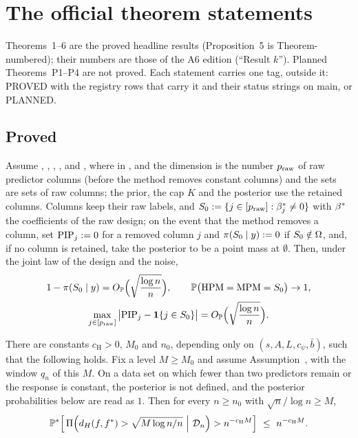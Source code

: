 \section{The official theorem statements}\label{sec:theorems}

Theorems~1--6 are the proved headline results (Proposition~5 is Theorem-numbered); their numbers are those of the A6
edition (``Result $k$''). Planned Theorems~P1--P4 are not proved. Each statement carries one tag, outside it: PROVED with
the registry rows that carry it and their status strings on main, or PLANNED.

\subsection{Proved}\label{sec:proved}

\begin{mainthm}\label{thm:post-random}
Assume , , , ,  and , where in ,  and  the
dimension is the number $p_{\mathrm{raw}}$ of raw predictor columns (before the method removes constant columns) and the sets are
sets of raw columns; the prior, the cap $K$ and the posterior use the retained columns. Columns keep their raw labels, and $S_0:=\{j\in[p_{\mathrm{raw}}]:\beta^*_j\neq0\}$ with $\beta^*$ the coefficients of
the raw design; on the event that the method removes a column, set $\mathrm{PIP}_j:=0$ for a removed column $j$ and
$\pi(S_0\mid y):=0$ if $S_0\notin\Omega$, and, if no column is retained, take the posterior to be a point mass at $\emptyset$.
Then, under the joint law of the design and the noise,
\begin{gather}
  1-\pi(S_0\mid y)=O_{\mathbb{P}}\Big(\sqrt{\frac{\log n}{n}}\Big),\qquad \mathbb{P}\big(\mathrm{HPM}=\mathrm{MPM}=S_0\big)\to1,\label{eq:post-random}\\
  \max_{j\in[p_{\mathrm{raw}}]}\big|\mathrm{PIP}_j-\mathbf{1}\{j\in S_0\}\big|=O_{\mathbb{P}}\Big(\sqrt{\frac{\log n}{n}}\Big).\nonumber
\end{gather}
\end{mainthm}


\begin{mainthm}\label{thm:dist}
There are constants $c_{\mathrm H}>0$, $M_0$ and $n_0$, depending only on $(s,A,L,c_\psi,\bar b)$, such that the following
holds. Fix a level $M\ge M_0$ and assume Assumption~, with the window $q_n$ of this $M$. On a data set on which fewer
than two predictors remain or the response is constant, the posterior is not defined, and the posterior probabilities
below are read as $1$. Then for every $n\ge n_0$ with $\sqrt n/\log n\ge M$,
\begin{equation}\label{eq:dist-i}
  \P^*\Big[\,\Pi\Big(d_H(f,f^*)>\sqrt{M\log n/n}\ \Big|\ \Dn\Big)>n^{-c_{\mathrm H} M}\Big]\ \le\ n^{-c_{\mathrm H} M}.
\end{equation}
\end{mainthm}

